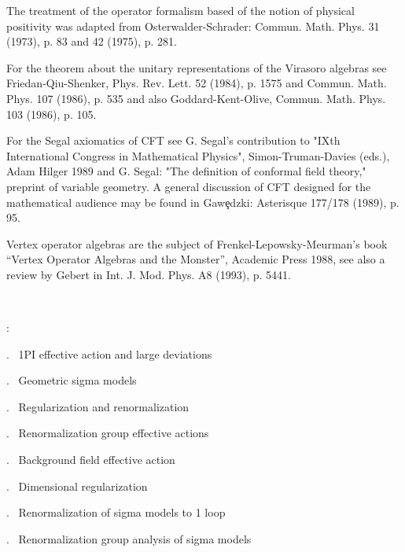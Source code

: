 The treatment of the operator formalism based of the notion
of physical positivity was adapted from Osterwalder-Schrader:
Commun. Math. Phys. 31 (1973), p. 83 \s and 42 (1975), p. 281.
\vskip 0.4cm

For the theorem about the unitary representations of the Virasoro
algebras see Friedan-Qiu-Shenker, Phys. Rev. Lett. 52 (1984),
p. 1575 and Commun. Math. Phys. 107 (1986), p. 535 and also
Goddard-Kent-Olive, Commun. Math. Phys. 103 (1986), p. 105.
\vskip 0.4cm

For the Segal axiomatics of CFT see
G. Segal's contribution to "IXth International Congress
in Mathematical Physics", Simon-Truman-Davies (eds.),
Adam Hilger 1989 and G. Segal: "The definition of conformal field
theory," preprint of variable geometry. A general discussion of CFT
designed for the mathematical audience may be found in \s Gaw\c{e}dzki:
Asterisque 177/178 (1989), p. 95.
\vskip 0.4cm

Vertex operator algebras are the subject of Frenkel-Lepowsky-Meurman's
book ``Vertex Operator Algebras and the Monster'', Academic Press 1988,
see also a review by Gebert in Int. J. Mod. Phys. A8 (1993), p. 5441.

\eject


\
\vskip 0.8cm

\addtocounter{equation}{-78}
\vskip 0.8cm

\no{}:
\vskip 0.5cm

. \ 1PI effective action and large deviations

. \ Geometric sigma models

. \ Regularization and renormalization

. \ Renormalization group effective actions

. \ Background field effective action

. \ Dimensional regularization

. \ Renormalization of sigma models to 1 loop

. \ Renormalization group analysis of sigma models
\vskip 1.7cm


\vskip 0.5cm

